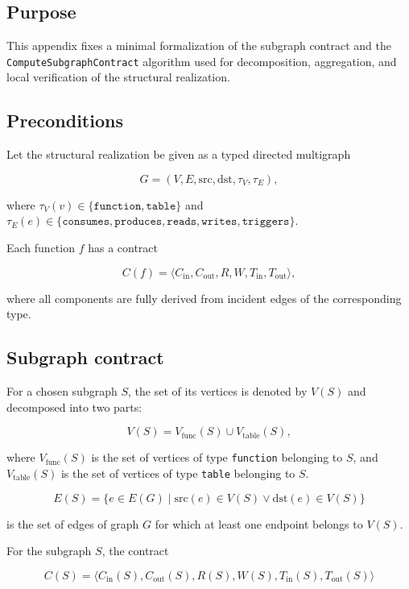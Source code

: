 \subsection{Purpose}

This appendix fixes a minimal formalization of the subgraph contract and the \texttt{ComputeSubgraphContract} algorithm used for decomposition, aggregation, and local verification of the structural realization.

\subsection{Preconditions}

Let the structural realization be given as a typed directed multigraph


$$G = (V, E, \mathrm{src}, \mathrm{dst}, \tau_V, \tau_E),$$

where $\tau_V(v) \in \{\texttt{function}, \texttt{table}\}$ and $\tau_E(e) \in \{\texttt{consumes}, \texttt{produces}, \texttt{reads}, \texttt{writes}, \texttt{triggers}\}$.

Each function $f$ has a contract


$$C(f) = \langle C_{\mathrm{in}}, C_{\mathrm{out}}, R, W, T_{\mathrm{in}}, T_{\mathrm{out}} \rangle,$$

where all components are fully derived from incident edges of the corresponding type.

\subsection{Subgraph contract}

For a chosen subgraph $S$, the set of its vertices is denoted by $V(S)$ and decomposed into two parts:


$$V(S) = V_{\mathrm{func}}(S) \cup V_{\mathrm{table}}(S),$$

where $V_{\mathrm{func}}(S)$ is the set of vertices of type \texttt{function} belonging to $S$, and $V_{\mathrm{table}}(S)$ is the set of vertices of type \texttt{table} belonging to $S$.


$$E(S) = \{ e \in E(G) \mid \mathrm{src}(e) \in V(S) \lor \mathrm{dst}(e) \in V(S) \}$$

is the set of edges of graph $G$ for which at least one endpoint belongs to $V(S)$.

For the subgraph $S$, the contract


$$C(S) = \langle C_{\mathrm{in}}(S), C_{\mathrm{out}}(S), R(S), W(S), T_{\mathrm{in}}(S), T_{\mathrm{out}}(S) \rangle$$

